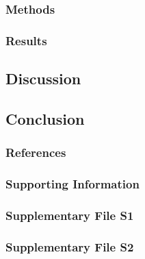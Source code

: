 \documentclass[12pt,portrait]{article}
\begin{document}
\hypertarget{methods}{%
\subsubsection{Methods}\label{methods}}

\hypertarget{results}{%
\subsubsection{Results}\label{results}}

\hypertarget{discussion}{%
\subsection{Discussion}\label{discussion}}

\hypertarget{conclusion}{%
\subsection{Conclusion}\label{conclusion}}

\clearpage
\singlespacing

\hypertarget{references}{%
\subsubsection{References}\label{references}}

\setlength{\parindent}{-0.2in}
\setlength{\leftskip}{0.2in}
\setlength{\parskip}{8pt}

\hypertarget{refs}{}

\doublespacing
\setlength{\parindent}{0.2in}

\hypertarget{supporting-information}{%
\subsubsection{Supporting Information}\label{supporting-information}}

\hypertarget{supplementary-file-s1}{%
\subsubsection{Supplementary File S1}\label{supplementary-file-s1}}

\hypertarget{supplementary-file-s2}{%
\subsubsection{Supplementary File S2}\label{supplementary-file-s2}}
\end{document}
